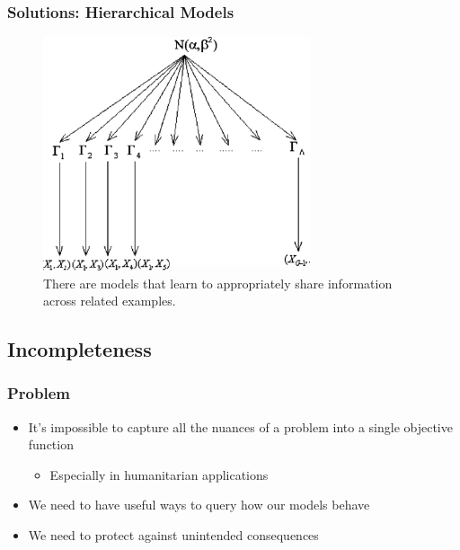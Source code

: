 \documentclass[10pt,mathserif]{beamer}
\begin{document}
\begin{frame}
  \frametitle{Solutions: Hierarchical Models}
  \begin{figure}[ht]
    \centering
    \includegraphics[width=0.7\textwidth]{figures/indian_buffet}
    \caption{There are models that learn to appropriately share information
      across related examples. \label{fig:label} }
\end{figure}
\end{frame}

\subsection{Incompleteness}
\label{subsec:label}

\begin{frame}
  \frametitle{Problem}
  \begin{itemize}
  \item It's impossible to capture all the nuances of a problem into a single
    objective function
    \begin{itemize}
    \item Especially in humanitarian applications
    \end{itemize}
  \item We need to have useful ways to query how our models behave
  \item We need to protect against unintended consequences
  \end{itemize}
\end{frame}
\end{document}
